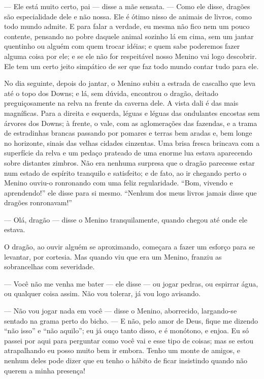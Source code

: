 — Ele está muito certo, pai — disse a mãe sensata. — Como ele disse,
dragões são especialidade dele e não nossa. Ele é ótimo nisso de
animais de livros, como todo mundo admite. E para falar a verdade, eu
mesma não fico nem um pouco contente, pensando no pobre daquele
animal sozinho lá em cima, sem um jantar quentinho ou alguém com quem
trocar idéias; e quem sabe poderemos fazer alguma coisa por ele; e se
ele não for respeitável nosso Menino vai logo descobrir. Ele tem um
certo jeito simpático de ser que faz todo mundo contar tudo para ele.

No dia seguinte, depois do jantar, o Menino subiu a estrada de
cascalho que leva até o topo dos Downs; e lá, sem dúvida, encontrou o
dragão, deitado preguiçosamente na relva na frente da caverna dele. A
vista dali é das mais magníficas. Para a direita e esquerda, léguas e
léguas das ondulantes encostas sem árvores dos Downs; à frente, o
vale, com as aglomerações das fazendas, e a trama de estradinhas
brancas passando por pomares e terras bem aradas e, bem longe no
horizonte, sinais das velhas cidades cinzentas. Uma brisa fresca
brincava com a superfície da relva e um pedaço prateado de uma enorme
lua estava aparecendo sobre distantes zimbros. Não era nenhuma
surpresa que o dragão parecesse estar num estado de espírito
tranquilo e satisfeito; e de fato, ao ir chegando perto o Menino
ouviu-o ronronando com uma feliz regularidade. “Bom, vivendo e
aprendendo!” ele disse para si mesmo. “Nenhum dos meus livros jamais
disse que dragões ronronavam!” 

— Olá, dragão — disse o Menino tranquilamente, quando chegou até onde
ele estava.

O dragão, ao ouvir alguém se aproximando, começara a fazer um esforço
para se levantar, por cortesia. Mas quando viu que era um Menino,
franziu as sobrancelhas com severidade.

— Você não me venha me bater — ele disse — ou jogar pedras, ou
espirrar água, ou qualquer coisa assim. Não vou tolerar, já vou logo
avisando.

— Não vou jogar nada em você — disse o Menino, aborrecido, largando-se
sentado na grama perto do bicho. — E não, pelo amor de Deus, fique me
dizendo “não isso” e “não aquilo”; eu já ouço tanto disso, e é
monótono, e enjoa. Eu só passei por aqui para perguntar como você vai
e esse tipo de coisas; mas se estou atrapalhando eu posso muito bem
ir embora. Tenho um monte de amigos, e nenhum deles pode dizer que eu
tenho o hábito de ficar insistindo quando não querem a minha
presença!


